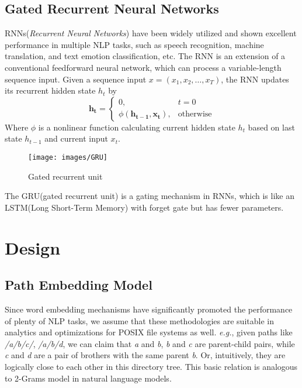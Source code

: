 \documentclass[conference]{IEEEtran}
\begin{document}
\subsection{Gated Recurrent Neural Networks}
RNNs(\textit{Recurrent Neural Networks}) have been widely utilized and shown excellent performance in multiple NLP tasks,
such as speech recognition, machine translation, and text emotion classification, etc.
The RNN is an extension of a conventional feedforward neural network, which can process a variable-length sequence input.
Given a sequence input $x = (x_1, x_2, \dots, x_T)$, the RNN updates its recurrent hidden state $h_t$ by
\begin{equation}
    \mathbf{h_t}=
        \begin{cases}
            0, &t=0 \\
            \phi(\mathbf{h_{t-1}, \mathbf{x_t}}), &\text{otherwise}
        \end{cases}
\end{equation}
Where $\phi$ is a nonlinear function calculating current hidden state $h_t$ based on last state $h_{t-1}$ and current input $x_t$.

\begin{figure}
\centering
\texttt{[image: images/GRU]}
\caption{Gated recurrent unit}
\end{figure}
The GRU(gated recurrent unit)\cite{GRU} is a gating mechanism in RNNs, 
which is like an LSTM(Long Short-Term Memory)\cite{LSTM} with forget gate but has fewer parameters.


\section{Design}
\subsection{Path Embedding Model}
Since word embedding mechanisms have significantly promoted the performance of plenty of NLP tasks, 
we assume that these methodologies are suitable in analytics and optimizations for POSIX file systems as well.
\textit{e.g.}, given paths like \textit{/a/b/c/}, \textit{/a/b/d}, we can claim that \textit{a} and \textit{b},
\textit{b} and \textit{c} are parent-child pairs, while \textit{c} and \textit{d} are a pair of brothers with the same parent \textit{b}.
Or, intuitively, they are logically close to each other in this directory tree. 
This basic relation is analogous to 2-Grams model in natural language models.
\end{document}

